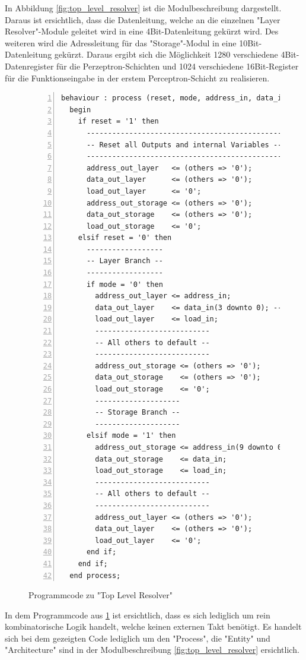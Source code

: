 \documentclass{article}
\numberwithin{equation}{section}
\begin{document}
\FloatBarrier
In Abbildung \ref{fig:top_level_resolver} ist die Modulbeschreibung dargestellt.
Daraus ist ersichtlich, dass die Datenleitung, welche an die einzelnen "Layer Resolver"-Module
geleitet wird in eine 4Bit-Datenleitung gekürzt wird. Des weiteren wird die Adressleitung
für das "Storage"-Modul in eine 10Bit-Datenleitung gekürzt. Daraus ergibt sich die Möglichkeit
1280 verschiedene 4Bit-Datenregister für die Perzeptron-Schichten und 1024 verschiedene
16Bit-Register für die Funktionseingabe in der erstem Perceptron-Schicht zu realisieren.
\begin{figure}[htbp]
\begin{lstlisting}[style=VHDL,numbers=left,stepnumber=1,basicstyle=\footnotesize]
behaviour : process (reset, mode, address_in, data_in, load_in) is
  begin
    if reset = '1' then
      ----------------------------------------------
      -- Reset all Outputs and internal Variables --
      ----------------------------------------------
      address_out_layer   <= (others => '0');
      data_out_layer      <= (others => '0');
      load_out_layer      <= '0';
      address_out_storage <= (others => '0');
      data_out_storage    <= (others => '0');
      load_out_storage    <= '0';
    elsif reset = '0' then
      ------------------
      -- Layer Branch --
      ------------------
      if mode = '0' then
        address_out_layer <= address_in;
        data_out_layer    <= data_in(3 downto 0); -- least significant bits
        load_out_layer    <= load_in;
        ---------------------------
        -- All others to default --
        ---------------------------
        address_out_storage <= (others => '0');
        data_out_storage    <= (others => '0');
        load_out_storage    <= '0';
        --------------------
        -- Storage Branch --
        --------------------
      elsif mode = '1' then
        address_out_storage <= address_in(9 downto 0); -- least significant bits
        data_out_storage    <= data_in;
        load_out_storage    <= load_in;
        ---------------------------
        -- All others to default --
        ---------------------------
        address_out_layer <= (others => '0');
        data_out_layer    <= (others => '0');
        load_out_layer    <= '0';
      end if;
    end if;
  end process;
\end{lstlisting}
\caption{Programmcode zu "Top Level Resolver"} \label{code:top_level_resolver}
\end{figure}
\FloatBarrier
In dem Programmcode aus \ref{code:top_level_resolver} ist ersichtlich, dass es sich lediglich
um rein kombinatorische Logik handelt, welche keinen externen Takt benötigt. Es handelt 
sich bei dem gezeigten Code lediglich um den "Process", die "Entity" und "Architecture"
sind in der Modulbeschreibung \ref{fig:top_level_resolver} ersichtlich.
\pagebreak
\end{document}
